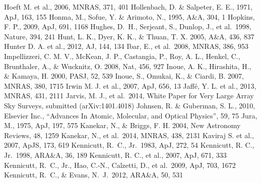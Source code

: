 \begin{thebibliography}{99}
\begin{multicols}{2}
{	Hoeft M. et al., 2006, MNRAS, 371, 401
	Hollenbach, D. \& Salpeter, E. E., 1971, ApJ, 163, 155
	Honma, M., Sofue, Y. \& Arimoto, N., 1995, A\&A, 304, 1
	Hopkins, F. P., 2009, ApJ, 691, 1168
	Hughes, D.~H., Serjeant, S., Dunlop, J., et al.\ 1998, Nature, 394, 241 
    	Hunt, L. K., Dyer, K. K., \& Thuan, T. X. 2005, A\&A, 436, 837
	Hunter D. A. et al., 2012, AJ, 144, 134
    	Ibar, E., et al.\ 2008, MNRAS, 386, 953
    	Impellizzeri, C. M. V., McKean, J. P., Castangia, P., Roy, A. L.,
   	Henkel, C.,  Brunthaler, A., \& Wucknitz, O. 2008, Nat, 456, 927
    	Inoue, A. K., Hirashita, H., \& Kamaya, H. 2000, PASJ, 52, 539
    	Inoue, S., Omukai, K., \& Ciardi, B. 2007, MNRAS, 380, 1715
	Irwin M. J. et al., 2007, ApJ, 656, 13
	Jaff{\'e}, Y. L. et al., 2013, MNRAS, 431, 2111
    	Jarvis, M. J., et al.\ 2014, White Paper for Very Large Array Sky Surveys, submitted (arXiv:1401.4018)
	Johnsen, R. \& Guberman, S. L., 2010, Elsevier Inc., 
	``Advances In Atomic, Molecular, and Optical Physics'', 59, 75
	Jura, M., 1975, ApJ, 197, 575
    	Kanekar, N., \& Briggs, F. H. 2004, New Astronomy Reviews, 48, 1259
    	Kanekar, N., et al.\ 2014, MNRAS, 438, 2131
	Kaviraj S. et al., 2007, ApJS, 173, 619
	Kennicutt, R.~C., Jr.\ 1983, ApJ, 272, 54 
    	Kennicutt, R. C., Jr.\ 1998, ARA\&A, 36, 189
	Kennicutt, R. C., et al., 2007, ApJ, 671, 333
	Kennicutt, R.~C., Jr., Hao, C.-N., Calzetti, D., et al.\ 2009, ApJ, 703, 1672 
	Kennicutt, R.~C., \& Evans, N.~J.\ 2012, ARA\&A, 50, 531 
}
\end{multicols}
\end{thebibliography}
